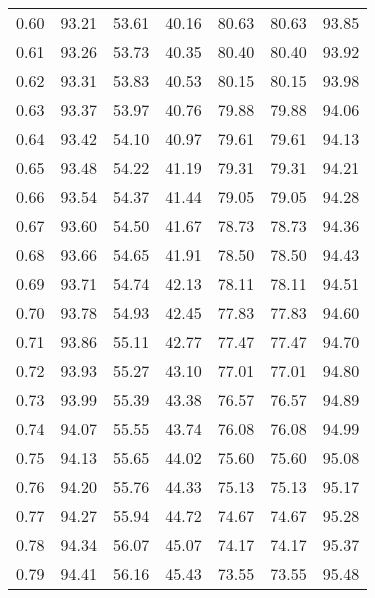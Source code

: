 \begin{tabular}{|c|c|c|c|c|c|c|}
      0.60 &     93.21 &     53.61 &      40.16 &   80.63 &      80.63 &         93.85 \\
      0.61 &     93.26 &     53.73 &      40.35 &   80.40 &      80.40 &         93.92 \\
      0.62 &     93.31 &     53.83 &      40.53 &   80.15 &      80.15 &         93.98 \\
      0.63 &     93.37 &     53.97 &      40.76 &   79.88 &      79.88 &         94.06 \\
      0.64 &     93.42 &     54.10 &      40.97 &   79.61 &      79.61 &         94.13 \\
      0.65 &     93.48 &     54.22 &      41.19 &   79.31 &      79.31 &         94.21 \\
      0.66 &     93.54 &     54.37 &      41.44 &   79.05 &      79.05 &         94.28 \\
      0.67 &     93.60 &     54.50 &      41.67 &   78.73 &      78.73 &         94.36 \\
      0.68 &     93.66 &     54.65 &      41.91 &   78.50 &      78.50 &         94.43 \\
      0.69 &     93.71 &     54.74 &      42.13 &   78.11 &      78.11 &         94.51 \\
      0.70 &     93.78 &     54.93 &      42.45 &   77.83 &      77.83 &         94.60 \\
      0.71 &     93.86 &     55.11 &      42.77 &   77.47 &      77.47 &         94.70 \\
      0.72 &     93.93 &     55.27 &      43.10 &   77.01 &      77.01 &         94.80 \\
      0.73 &     93.99 &     55.39 &      43.38 &   76.57 &      76.57 &         94.89 \\
      0.74 &     94.07 &     55.55 &      43.74 &   76.08 &      76.08 &         94.99 \\
      0.75 &     94.13 &     55.65 &      44.02 &   75.60 &      75.60 &         95.08 \\
      0.76 &     94.20 &     55.76 &      44.33 &   75.13 &      75.13 &         95.17 \\
      0.77 &     94.27 &     55.94 &      44.72 &   74.67 &      74.67 &         95.28 \\
      0.78 &     94.34 &     56.07 &      45.07 &   74.17 &      74.17 &         95.37 \\
      0.79 &     94.41 &     56.16 &      45.43 &   73.55 &      73.55 &         95.48 \\

\end{tabular}

